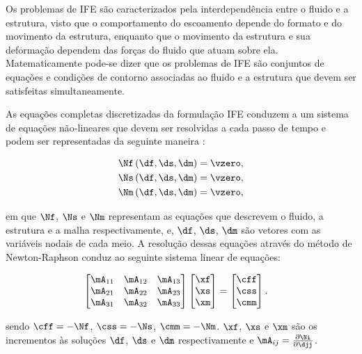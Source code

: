 Os problemas de IFE são caracterizados pela interdependência entre o fluido e a estrutura, visto que o comportamento do escoamento depende do formato e do movimento da estrutura, enquanto que o movimento da estrutura e sua deformação dependem das forças do fluido que atuam sobre ela. Matematicamente pode-se dizer que os problemas de IFE são conjuntos de equações e condições de contorno associadas ao fluido e a estrutura que devem ser satisfeitas simultaneamente.

As equações completas discretizadas da formulação IFE conduzem a um sistema de equações não-lineares que devem ser resolvidas a cada passo de tempo e podem ser representadas da seguinte maneira \cite{BazilevsTT:2013}:

\begin{align}
	\Nf\left(\df,\ds,\dm\right) = \vzero, \label{eq:N1}\\ 
	\Ns\left(\df,\ds,\dm\right) = \vzero,\label{eq:N2}\\
	\Nm\left(\df,\ds,\dm\right) = \vzero \label{eq:N3},
\end{align}

\noindent em que $\Nf$, $\Ns$ e $\Nm$ representam as equações que descrevem o fluido, a estrutura e a malha respectivamente, e, $\df$, $\ds$, $\dm$ são vetores com as variáveis nodais de cada meio. 
A resolução dessas equações através do método de Newton-Raphson conduz ao seguinte sistema linear de equações:

\begin{align}
	\begin{bmatrix}
		\mA_{11} & \mA_{12} & \mA_{13} \\
		\mA_{21} & \mA_{22} & \mA_{23} \\
		\mA_{31} & \mA_{32} & \mA_{33}
	\end{bmatrix}
	\begin{bmatrix}
		\xf \\
		\xs \\
		\xm
	\end{bmatrix}
	&=
	\begin{bmatrix}
		\cff \\
		\css \\
		\cmm
	\end{bmatrix}.
	\label{eq:sist_lin_IFE}
\end{align}	

\noindent sendo $\cff = - \Nf$, $\css = - \Ns$, $\cmm = - \Nm$. $\xf$, $\xs$ e $\xm$ são os incrementos às soluções $\df$, $\ds$ e $\dm$ respectivamente e $\mA_{ij} = \frac{\partial\Ni}{\partial\djj}$. 

